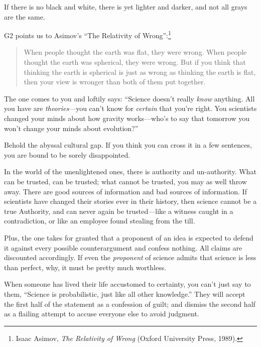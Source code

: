 {
 If there is no black and white, there is yet lighter and darker,
and not all grays are the same.}

{
 G2 points us to Asimov's ``The
Relativity of Wrong'':\footnote{Isaac Asimov, \textit{The Relativity of Wrong} (Oxford
University Press, 1989).}}

\begin{quote}
{
 When people thought the earth was flat, they were wrong. When
people thought the earth was spherical, they were wrong. But if you
think that thinking the earth is spherical is just as wrong as thinking
the earth is flat, then your view is wronger than both of them put
together.}
\end{quote}

\myendsectiontext


\bigskip


{
 The one comes to you and loftily says: ``Science
doesn't really \textit{know} anything. All you have are
\textit{theories}{}---you can't know for
\textit{certain} that you're right. You scientists
changed your minds about how gravity works---who's to
say that tomorrow you won't change your minds about
evolution?'' }

{
 Behold the abyssal cultural gap. If you think you can cross it in
a few sentences, you are bound to be sorely disappointed.}

{
 In the world of the unenlightened ones, there is authority and
un-authority. What can be trusted, can be trusted; what cannot be
trusted, you may as well throw away. There are good sources of
information and bad sources of information. If scientists have changed
their stories ever in their history, then science cannot be a true
Authority, and can never again be trusted---like a witness caught in a
contradiction, or like an employee found stealing from the till.}

{
 Plus, the one takes for granted that a proponent of an idea is
expected to defend it against every possible counterargument and
confess nothing. All claims are discounted accordingly. If even the
\textit{proponent} of science admits that science is less than perfect,
why, it must be pretty much worthless.}

{
 When someone has lived their life accustomed to certainty, you
can't just say to them, ``Science is
probabilistic, just like all other knowledge.'' They
will accept the first half of the statement as a confession of guilt;
and dismiss the second half as a flailing attempt to accuse everyone
else to avoid judgment.}

